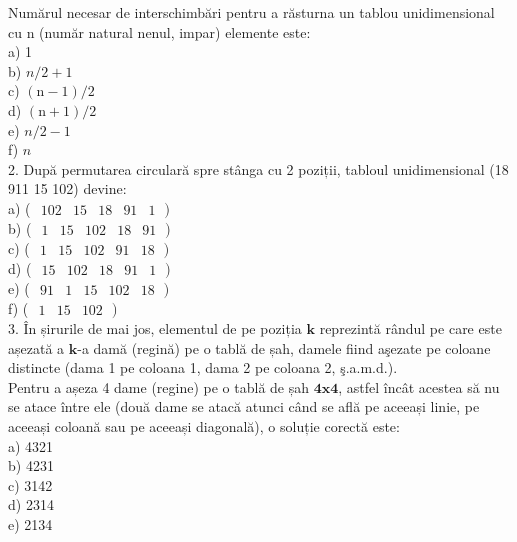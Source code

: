 Numărul necesar de interschimbări pentru a răsturna un tablou unidimensional cu n (număr natural nenul, impar) elemente este:\\
a) 1\\
b) $n / 2+1$\\
c) $(\mathrm{n}-1) / 2$\\
d) $(\mathrm{n}+1) / 2$\\
e) $n / 2-1$\\
f) $n$\\
2. După permutarea circulară spre stânga cu 2 poziții, tabloul unidimensional (18 911 15 102) devine:\\
a) ( $\left.\begin{array}{lllll}102 & 15 & 18 & 91 & 1\end{array}\right)$\\
b) ( $\left.\begin{array}{lllll}1 & 15 & 102 & 18 & 91\end{array}\right)$\\
c) ( $\left.\begin{array}{lllll}1 & 15 & 102 & 91 & 18\end{array}\right)$\\
d) ( $\left.\begin{array}{lllll}15 & 102 & 18 & 91 & 1\end{array}\right)$\\
e) ( $\left.\begin{array}{lllll}91 & 1 & 15 & 102 & 18\end{array}\right)$\\
f) ( $\left.\begin{array}{lll}1 & 15 & 102\end{array}\right)$\\
3. În șirurile de mai jos, elementul de pe poziția $\mathbf{k}$ reprezintă rândul pe care este așezată a $\mathbf{k}$-a damă (regină) pe o tablă de șah, damele fiind aşezate pe coloane distincte (dama 1 pe coloana 1, dama 2 pe coloana 2, ş.a.m.d.).\\
Pentru a așeza 4 dame (regine) pe o tablă de șah $\mathbf{4 x 4}$, astfel încât acestea să nu se atace între ele (două dame se atacă atunci când se află pe aceeași linie, pe aceeași coloană sau pe aceeași diagonală), o soluție corectă este:\\
a) 4321\\
b) 4231\\
c) 3142\\
d) 2314\\
e) 2134\\
